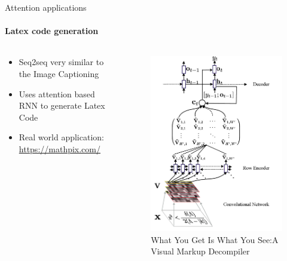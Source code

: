 \documentclass{beamer}
\begin{document}
\begin{frame}{Attention applications}
\framesubtitle{Latex code generation}


\begin{columns}
\begin{column}{0.4\textwidth}
    \begin{itemize}
    \item Seq2seq very similar to the Image Captioning
    
    \item Uses attention based RNN to generate Latex Code
    
    \item Real world application: \url{https://mathpix.com/}
    
    \end{itemize}   
\end{column}
\begin{column}{0.6\textwidth}  %
\begin{figure}
\includegraphics[width = .5\textwidth]{images/im-2-latex.png}
\caption{What You Get Is What You See:A Visual Markup Decompiler\cite{markup-decompiler}}
\end{figure}{}
\end{column}
\end{columns}

    
\end{frame}
\end{document}
